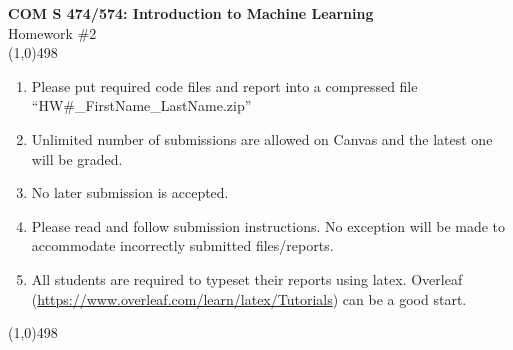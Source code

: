 \documentclass[11pt]{article}
\begin{document}
\begin{center}
{\Large \textbf{COM S 474/574: Introduction to Machine Learning}\\Homework \#2}\\

\linethickness{1mm}\line(1,0){498}

\begin{enumerate}
\item Please put required code files and report into a
compressed file ``HW\#\_FirstName\_LastName.zip''
\item Unlimited number of submissions are
allowed on Canvas and the latest one will be graded.
\item {\color{red} No later submission is accepted.}
\item Please read and follow submission instructions. No exception
will be made to accommodate incorrectly submitted files/reports.
\item All students are required to typeset their reports using
latex. Overleaf
(\url{https://www.overleaf.com/learn/latex/Tutorials}) can be a
good start.
\end{enumerate}

\linethickness{1mm}\line(1,0){498}

\end{center}


\end{document}
